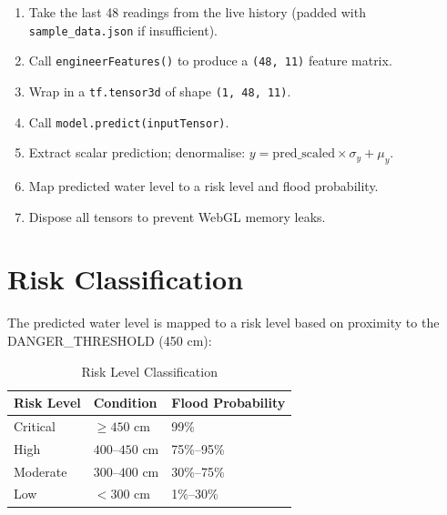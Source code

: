 \begin{enumerate}[leftmargin=1.5em]
  \item Take the last 48 readings from the live history (padded with \texttt{sample\_\allowbreak{}data.\allowbreak{}json} if insufficient).
  \item Call \texttt{engineerFeatures()} to produce a \texttt{(48,\allowbreak{} 11)} feature matrix.
  \item Wrap in a \texttt{tf.\allowbreak{}tensor3d} of shape \texttt{(1,\allowbreak{} 48,\allowbreak{} 11)}.
  \item Call \texttt{model.\allowbreak{}predict(inputTensor)}.
  \item Extract scalar prediction; denormalise: $y = \text{pred\_scaled} \times \sigma_y + \mu_y$.
  \item Map predicted water level to a risk level and flood probability.
  \item Dispose all tensors to prevent WebGL memory leaks.
\end{enumerate}

\section{Risk Classification}

The predicted water level is mapped to a risk level based on proximity to the DANGER\_THRESHOLD (450 cm):

\begin{table}[H]
\centering
\caption{Risk Level Classification}
\begin{tabularx}{\linewidth}{|l|l|X|}
\hline
\rowcolor{FloodLight}
\textbf{Risk Level} & \textbf{Condition} & \textbf{Flood Probability} \\
\hline
Critical & $\geq 450$ cm & 99\% \\
High & $400$--$450$ cm & 75\%--95\% \\
Moderate & $300$--$400$ cm & 30\%--75\% \\
Low & $< 300$ cm & 1\%--30\% \\
\hline
\end{tabularx}
\end{table}
